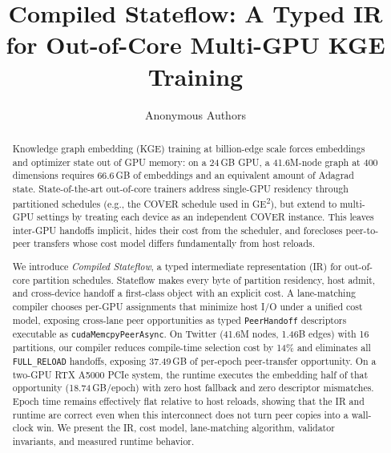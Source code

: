 \documentclass[sigconf, nonacm]{acmart}
\providecommand{\SI}[2]{#1\,#2}
\begin{document}
\title{Compiled Stateflow: A Typed IR for Out-of-Core Multi-GPU KGE Training}

\author{Anonymous Authors}

\begin{abstract}
Knowledge graph embedding (KGE) training at billion-edge scale forces
embeddings and optimizer state out of GPU memory: on a \SI{24}{GB}
GPU, a 41.6M-node graph at 400 dimensions requires \SI{66.6}{GB} of
embeddings and an equivalent amount of Adagrad state. State-of-the-art
out-of-core trainers address single-GPU residency through partitioned
schedules (e.g., the COVER schedule used in GE\textsuperscript{2}), but
extend to multi-GPU settings by treating each device as an independent
COVER instance. This leaves inter-GPU handoffs implicit, hides their
cost from the scheduler, and forecloses peer-to-peer transfers whose
cost model differs fundamentally from host reloads.
\par\vspace{0.5em}
We introduce \emph{Compiled Stateflow}, a typed intermediate
representation (IR) for out-of-core partition schedules. Stateflow makes
every byte of partition residency, host admit, and cross-device handoff
a first-class object with an explicit cost. A lane-matching compiler
chooses per-GPU assignments that minimize host I/O under a unified cost
model, exposing cross-lane peer opportunities as typed
\texttt{PeerHandoff} descriptors executable as \texttt{cudaMemcpyPeerAsync}.
On Twitter (41.6M nodes, 1.46B edges) with 16 partitions, our compiler
reduces compile-time selection cost by 14\% and eliminates all
\texttt{FULL\_RELOAD} handoffs, exposing \SI{37.49}{GB} of per-epoch
peer-transfer opportunity. On a two-GPU RTX A5000 PCIe system, the
runtime executes the embedding half of that opportunity
(\SI{18.74}{GB}/epoch) with zero host fallback and zero descriptor
mismatches. Epoch time remains effectively flat relative to host
reloads, showing that the IR and runtime are correct even when this
interconnect does not turn peer copies into a wall-clock win. We
present the IR, cost model, lane-matching algorithm, validator
invariants, and measured runtime behavior.
\end{abstract}


\maketitle
\end{document}
